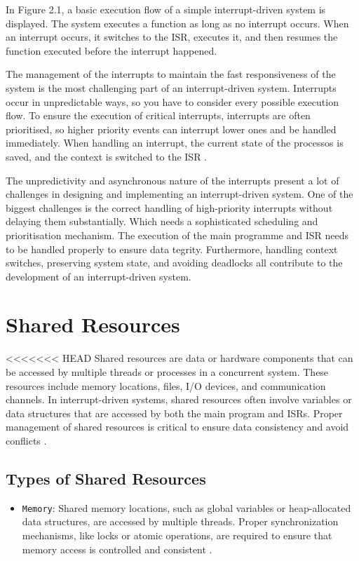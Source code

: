 \documentclass[
fancyheadings, %
%
%
]{stsreprt}
\begin{document}
{In Figure 2.1, a basic execution flow of a simple interrupt-driven system is displayed. The system executes a function as long as no interrupt occurs. When an interrupt occurs, it switches to the ISR, executes it, and then resumes the function executed before the interrupt happened.

The management of the interrupts to maintain the fast responsiveness of the system is the most challenging part of an interrupt-driven system. Interrupts occur in unpredictable ways, so you have to consider every possible execution flow. To ensure the execution of critical interrupts, interrupts are often prioritised, so higher priority events can interrupt lower ones and be handled immediately. When handling an interrupt, the current state of the processos is saved, and the context is switched to the ISR \cite{wang2020}.

The unpredictivity and asynchronous nature of the interrupts present a lot of challenges in designing and implementing an interrupt-driven system. One of the biggest challenges is the correct handling of high-priority interrupts without delaying them substantially. Which needs a sophisticated scheduling and prioritisation mechanism. The execution of the main programme and ISR needs to be handled properly to ensure data tegrity. Furthermore, handling context switches, preserving system state, and avoiding deadlocks all contribute to the development of an interrupt-driven system.

\section{Shared Resources}
<<<<<<< HEAD
Shared resources are data or hardware components that can be accessed by multiple threads or processes in a concurrent system. These resources include memory locations, files, I/O devices, and communication channels. In interrupt-driven systems, shared resources often involve variables or data structures that are accessed by both the main program and ISRs. Proper management of shared resources is critical to ensure data consistency and avoid conflicts \cite{herlihy2008}.
\subsection{Types of Shared Resources}
\begin{itemize}
	\item \texttt{Memory}: Shared memory locations, such as global variables or heap-allocated data structures, are accessed by multiple threads. Proper synchronization mechanisms, like locks or atomic operations, are required to ensure that memory access is controlled and consistent \cite{herlihy2008}.


\end{itemize}}
\end{document}
